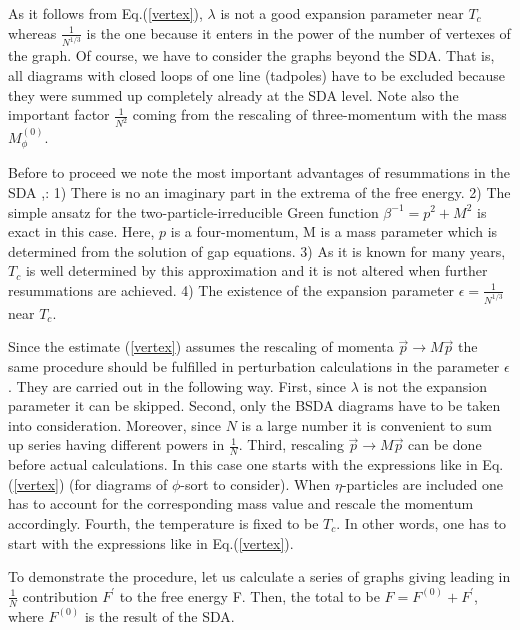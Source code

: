 \documentclass[a4paper,12pt]{article}
\begin{document}
As it follows from Eq.(\ref{vertex}), $\lambda$ is not a good
expansion parameter near $T_c$ whereas $\frac{1}{N^{1/3}}$ is the one
because it enters in the power of the number of vertexes of the
graph. Of course, we have to consider the graphs beyond the SDA. That
is, all diagrams with closed loops of one line (tadpoles) have to be
excluded because they were summed up completely already at the SDA
level. Note also the important factor $\frac{1}{N^2}$ coming from the
rescaling of three-momentum with the mass $M_{\phi}^{(0)}$.

Before to proceed we note the most important advantages of
resummations in the SDA \cite{prd},\cite{pl}: 1) There is no an
imaginary part in the extrema of the free energy. 2) The simple ansatz
for the two-particle-irreducible Green function $\beta^{-1} = p^2 +
M^2$ is exact in this case. Here, $p$ is a four-momentum, M is a mass
parameter which is determined from the solution of gap equations. 3)
As it is known for many years, $T_c$ is well determined by this
approximation and it is not altered when further resummations are
achieved. 4) The existence of the expansion parameter $\epsilon =
\frac{1}{N^{1/3}}$ near $T_c$.

Since the estimate (\ref{vertex}) assumes the rescaling of momenta
$\vec{p} \rightarrow M \vec{p}$ the same procedure should be fulfilled
in perturbation calculations in the parameter $\epsilon$. They are
carried out in the following way. First, since $\lambda$ is not the
expansion parameter it can be skipped. Second, only the BSDA diagrams
have to be taken into consideration. Moreover, since $N$ is a large
number it is convenient to sum up series having different powers in
$\frac{1}{N}$. Third, rescaling $\vec{p} \rightarrow M\vec{p}$ can be
done before actual calculations. In this case one starts with the
expressions like in Eq.(\ref{vertex}) (for diagrams of $\phi$-sort to
consider). When $\eta$-particles are included one has to account for
the corresponding mass value and rescale the momentum
accordingly. Fourth, the temperature is fixed to be $T_c$. In other
words, one has to start with the expressions like in
Eq.(\ref{vertex}).

To demonstrate the procedure, let us calculate a series of graphs
giving leading in $\frac{1}{N}$ contribution $ F^{'}$ to the free energy
F. Then, the total to be $F = F^{(0)} + F^{'}$, where $F^{(0)}$ is the
result of the SDA.
\end{document}

